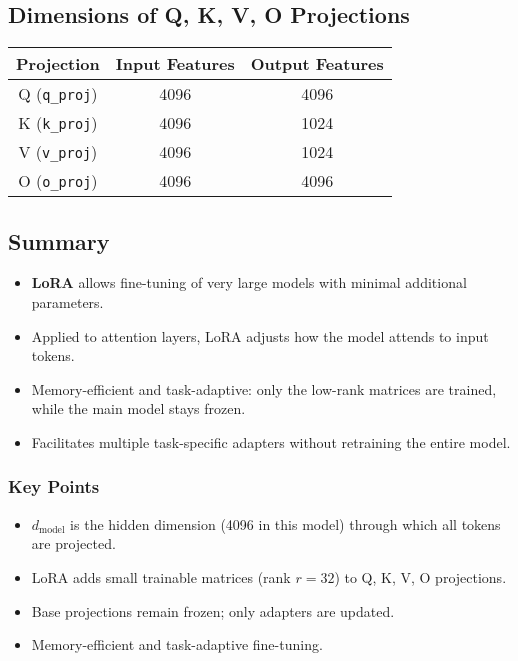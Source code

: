 \documentclass[a4paper, 12pt]{article}
\begin{document}
\subsection*{Dimensions of Q, K, V, O Projections}

\begin{tcolorbox}[colback=blue!5!white,colframe=blue!75!black,title=Attention Projection Dimensions]
\begin{tabular}{|c|c|c|}
\hline
\textbf{Projection} & \textbf{Input Features} & \textbf{Output Features} \\
\hline
Q (\texttt{q\_proj}) & 4096 & 4096 \\
K (\texttt{k\_proj}) & 4096 & 1024 \\
V (\texttt{v\_proj}) & 4096 & 1024 \\
O (\texttt{o\_proj}) & 4096 & 4096 \\
\hline
\end{tabular}
\end{tcolorbox}

\subsection*{Summary}

\begin{itemize}
    \item \textbf{LoRA} allows fine-tuning of very large models with minimal additional parameters.  
    \item Applied to attention layers, LoRA adjusts how the model attends to input tokens.  
    \item Memory-efficient and task-adaptive: only the low-rank matrices are trained, while the main model stays frozen.  
    \item Facilitates multiple task-specific adapters without retraining the entire model.
\end{itemize}

\subsubsection*{Key Points}

\begin{itemize}
    \item $d_{\text{model}}$ is the hidden dimension (4096 in this model) through which all tokens are projected.
    \item LoRA adds small trainable matrices (rank $r = 32$) to Q, K, V, O projections.
    \item Base projections remain frozen; only adapters are updated.
    \item Memory-efficient and task-adaptive fine-tuning.
\end{itemize}
\end{document}
